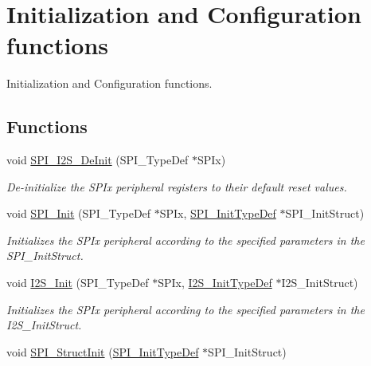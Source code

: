 \hypertarget{group___s_p_i___group1}{}\section{Initialization and Configuration functions}
\label{group___s_p_i___group1}


Initialization and Configuration functions.  


\subsection*{Functions}
\begin{DoxyCompactItemize}
\item 
void \mbox{\hyperlink{group___s_p_i___group1_gabe36880945fa56785283a9c0092124cc}{S\+P\+I\+\_\+\+I2\+S\+\_\+\+De\+Init}} (S\+P\+I\+\_\+\+Type\+Def $\ast$S\+P\+Ix)
\begin{DoxyCompactList}\small\item\em De-\/initialize the S\+P\+Ix peripheral registers to their default reset values. \end{DoxyCompactList}\item 
void \mbox{\hyperlink{group___s_p_i___group1_ga8dacc1dc48bf08c0f12da409f4889037}{S\+P\+I\+\_\+\+Init}} (S\+P\+I\+\_\+\+Type\+Def $\ast$S\+P\+Ix, \mbox{\hyperlink{struct_s_p_i___init_type_def}{S\+P\+I\+\_\+\+Init\+Type\+Def}} $\ast$S\+P\+I\+\_\+\+Init\+Struct)
\begin{DoxyCompactList}\small\item\em Initializes the S\+P\+Ix peripheral according to the specified parameters in the S\+P\+I\+\_\+\+Init\+Struct. \end{DoxyCompactList}\item 
void \mbox{\hyperlink{group___s_p_i___group1_ga53661884ae4a9640df7cbc59187782f7}{I2\+S\+\_\+\+Init}} (S\+P\+I\+\_\+\+Type\+Def $\ast$S\+P\+Ix, \mbox{\hyperlink{struct_i2_s___init_type_def}{I2\+S\+\_\+\+Init\+Type\+Def}} $\ast$I2\+S\+\_\+\+Init\+Struct)
\begin{DoxyCompactList}\small\item\em Initializes the S\+P\+Ix peripheral according to the specified parameters in the I2\+S\+\_\+\+Init\+Struct. \end{DoxyCompactList}\item 
void \mbox{\hyperlink{group___s_p_i___group1_ga9a0116f88cc2c4478c270f05608703f1}{S\+P\+I\+\_\+\+Struct\+Init}} (\mbox{\hyperlink{struct_s_p_i___init_type_def}{S\+P\+I\+\_\+\+Init\+Type\+Def}} $\ast$S\+P\+I\+\_\+\+Init\+Struct)

\end{DoxyCompactItemize}
